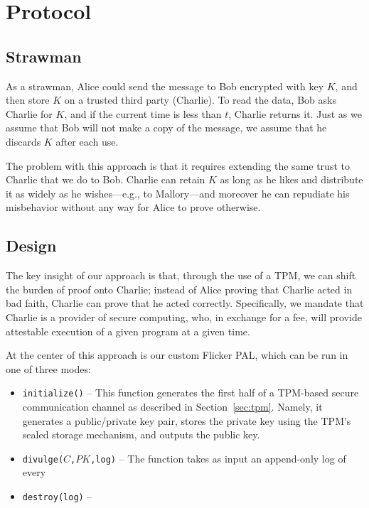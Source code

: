 \documentclass{article}
\begin{document}
\section{Protocol}

\subsection{Strawman}

As a strawman, Alice could send the message to Bob encrypted with key $K$, and then store $K$ on a trusted third party (Charlie). To read the data, Bob asks Charlie for $K$, and if the current time is less than $t$, Charlie returns it. Just as we assume that Bob will not make a copy of the message, we assume that he discards $K$ after each use.

The problem with this approach is that it requires extending the same trust to Charlie that we do to Bob. Charlie can retain $K$ as long as he likes and distribute it as widely as he wishes---e.g., to Mallory---and moreover he can repudiate his misbehavior without any way for Alice to prove otherwise.

\subsection{Design}

The key insight of our approach is that, through the use of a TPM, we can shift the burden of proof onto Charlie; instead of Alice proving that Charlie acted in bad faith, Charlie can prove that he acted correctly. Specifically, we mandate that Charlie is a provider of secure computing, who, in exchange for a fee, will provide attestable execution of a given program at a given time.

At the center of this approach is our custom Flicker PAL, which can be run in one of three modes:

\begin{itemize}
\item \texttt{initialize()} -- This function generates the first half of a TPM-based secure communication channel as described in Section~\ref{sec:tpm}. Namely, it generates a public/private key pair, stores the private key using the TPM's sealed storage mechanism, and outputs the public key.
\item \texttt{divulge($C$,$PK$,log)} -- The function takes as input an append-only log of every
\item \texttt{destroy(log)} --
\end{itemize}
\end{document}
